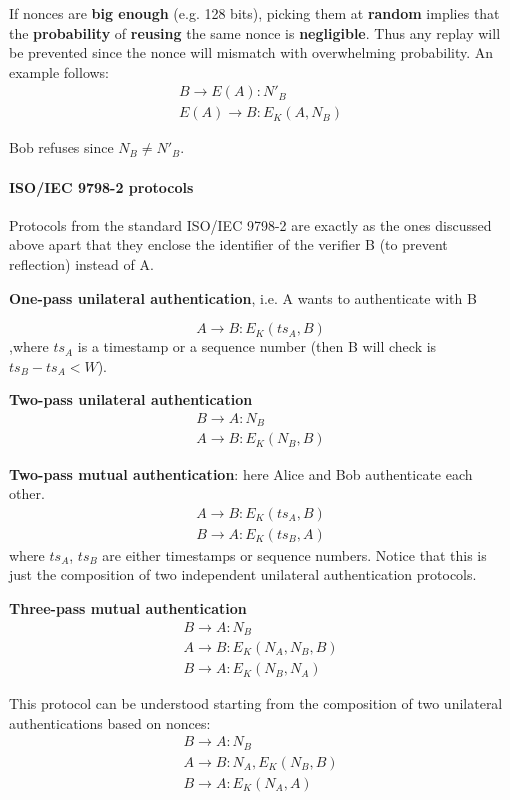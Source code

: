 If nonces are \textbf{big enough} (e.g. 128 bits), picking them at \textbf{random} implies that the \textbf{probability} of \textbf{reusing} the same nonce is \textbf{negligible}. Thus any replay will be prevented since the nonce will mismatch with overwhelming probability. An example follows:
$$\begin{array}{l} B \rightarrow E(A): N'_B\\E(A) \rightarrow B: E_K(A, N_B) \end{array}$$

Bob refuses since $N_B \neq N'_B$.

\paragraph{ISO/IEC 9798-2 protocols}
Protocols from the standard ISO/IEC 9798-2 are exactly as the ones discussed above apart that they enclose the identifier of the verifier B (to prevent reflection) instead of A.

\textbf{One-pass unilateral authentication}, i.e. A wants to authenticate with B

$$A \rightarrow B: E_K(ts_A,B)$$
,where $ts_A$ is a timestamp or a sequence number (then B will check is $ts_B - ts_A < W$).

\textbf{Two-pass unilateral authentication}
$$\begin{array}{l} B \rightarrow A: N_B\\A \rightarrow B: E_K(N_B, B) \end{array}$$

\textbf{Two-pass mutual authentication}: here Alice and Bob authenticate each other.
$$\begin{array}{l} A \rightarrow B: E_K(ts_A,B)\\B \rightarrow A: E_K(ts_B,A) \end{array}$$
where $ts_A$, $ts_B$ are either timestamps or sequence numbers. Notice that this is just the composition of two independent unilateral authentication protocols.

\textbf{Three-pass mutual authentication}
$$\begin{array}{l} B \rightarrow A: N_B\\A \rightarrow B: E_K(N_A,N_B,B)\\ B \rightarrow A: E_K(N_B,N_A)\end{array}$$

This protocol can be understood starting from the composition of two unilateral authentications based on nonces:
$$\begin{array}{l} B \rightarrow A: N_B\\A \rightarrow B: N_A,E_K(N_B,B)\\ B \rightarrow A: E_K(N_A,A)\end{array}$$

